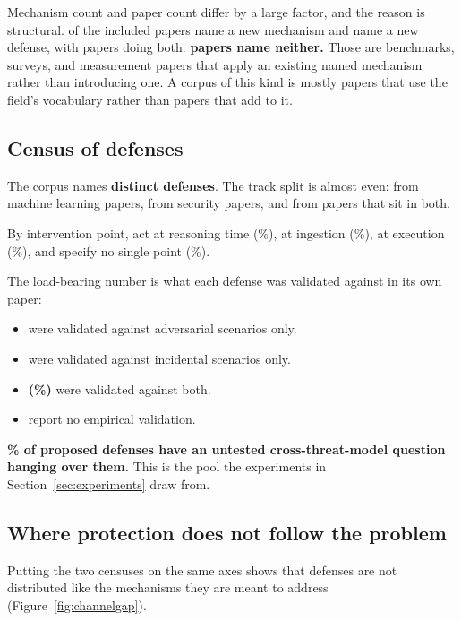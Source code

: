 Mechanism count and paper count differ by a large factor, and the reason is
structural. \NPapersMech{} of the \NCorpus{} included papers name a new
mechanism and \NPapersDef{} name a new defense, with \NPapersBoth{} papers
doing both. \textbf{\NPapersNeither{} papers name neither.} Those
are benchmarks, surveys, and measurement papers that apply an existing named
mechanism rather than introducing one. A corpus of this kind is mostly papers
that use the field's vocabulary rather than papers that add to it.

\subsection{Census of defenses}

The corpus names \textbf{\NDefenses{} distinct defenses}. The track split is
almost even: \NDefML{} from machine learning papers, \NDefSecurity{} from
security papers, and \NDefBoth{} from papers that sit in both.

By intervention point, \NDefPtReasoning{} act at reasoning time
(\PctDefPtReasoning{}\%), \NDefPtIngestion{} at ingestion
(\PctDefPtIngestion{}\%), \NDefPtExecution{} at execution
(\PctDefPtExecution{}\%), and \NDefPtNone{} specify no single point
(\PctDefPtNone{}\%).

The load-bearing number is what each defense was validated against in its own
paper:

\begin{itemize}
\item \textbf{\NAdvOnly{}} were validated against adversarial scenarios only.
\item \textbf{\NIncOnly{}} were validated against incidental scenarios only.
\item \textbf{\NBothValidated{} (\PctBothValidated{}\%)} were validated against both.
\item \NNoValidation{} report no empirical validation.
\end{itemize}

\textbf{\PctOneThreatModel{}\% of proposed defenses have an untested cross-threat-model question
hanging over them.} This is the pool the experiments in
Section~\ref{sec:experiments} draw from.

\subsection{Where protection does not follow the problem}

Putting the two censuses on the same axes shows that defenses are not
distributed like the mechanisms they are meant to address
(Figure~\ref{fig:channelgap}).

